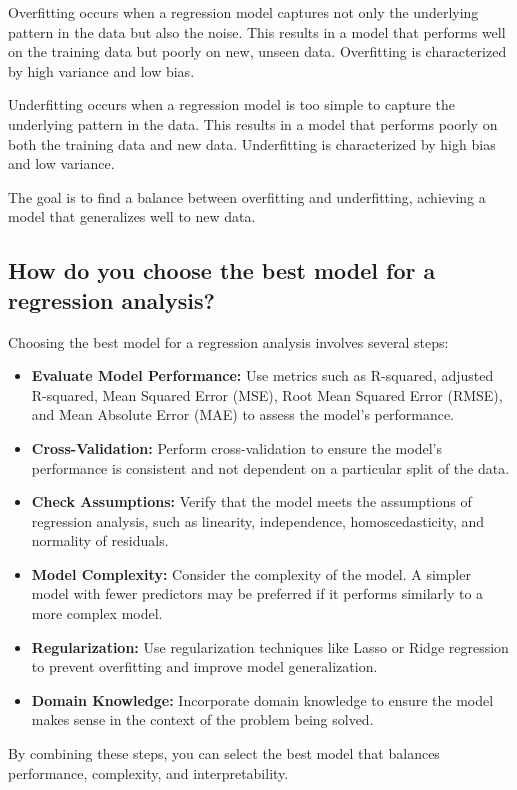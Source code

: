 \documentclass[12pt]{article}
\begin{document}
Overfitting occurs when a regression model captures not only the underlying pattern in the data but also the noise. This results in a model that performs well on the training data but poorly on new, unseen data. Overfitting is characterized by high variance and low bias.

Underfitting occurs when a regression model is too simple to capture the underlying pattern in the data. This results in a model that performs poorly on both the training data and new data. Underfitting is characterized by high bias and low variance.

The goal is to find a balance between overfitting and underfitting, achieving a model that generalizes well to new data.

\subsection{How do you choose the best model for a regression analysis?}

Choosing the best model for a regression analysis involves several steps:

\begin{itemize}
    \item \textbf{Evaluate Model Performance:} Use metrics such as R-squared, adjusted R-squared, Mean Squared Error (MSE), Root Mean Squared Error (RMSE), and Mean Absolute Error (MAE) to assess the model's performance.
    \item \textbf{Cross-Validation:} Perform cross-validation to ensure the model's performance is consistent and not dependent on a particular split of the data.
    \item \textbf{Check Assumptions:} Verify that the model meets the assumptions of regression analysis, such as linearity, independence, homoscedasticity, and normality of residuals.
    \item \textbf{Model Complexity:} Consider the complexity of the model. A simpler model with fewer predictors may be preferred if it performs similarly to a more complex model.
    \item \textbf{Regularization:} Use regularization techniques like Lasso or Ridge regression to prevent overfitting and improve model generalization.
    \item \textbf{Domain Knowledge:} Incorporate domain knowledge to ensure the model makes sense in the context of the problem being solved.
\end{itemize}

By combining these steps, you can select the best model that balances performance, complexity, and interpretability.
\end{document}
